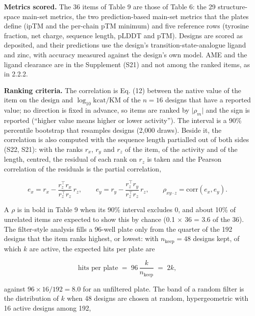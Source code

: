 \documentclass[
  10pt,
]{article}
\DeclareRobustCommand{\_}{\textunderscore\hspace{0pt}}
\begin{document}
\textbf{Metrics
scored.} The 36
items of Table 9 are
those of Table 6:
the 29
structure-space
main-set metrics,
the two
prediction-based
main-set metrics
that the plates
define (ipTM and the
per-chain pTM
minimum) and five
reference rows
(tyrosine fraction,
net charge, sequence
length, pLDDT and
pTM). Designs are
scored as deposited,
and their
predictions use the
design's
transition-state-analogue
ligand and zinc,
with accuracy
measured against the
design's own model.
AME and the ligand
clearance are in the
Supplement (S21) and
not among the ranked
items, as in 2.2.2.

\textbf{Ranking
criteria.} The
correlation is Eq.
(12) between the
native value of the
item on the design
and
\(\log_{10}\mathrm{kcat/KM}\)
of the \(n = 16\)
designs that have a
reported value; no
direction is fixed
in advance, so items
are ranked by
\(\lvert\rho_m\rvert\)
and the sign is
reported (``higher
value means higher
or lower
activity''). The
interval is a 90\%
percentile bootstrap
that resamples
designs (2,000
draws). Beside it,
the correlation is
also computed with
the sequence length
partialled out of
both sides (S22,
S21): with the ranks
\(r_x\), \(r_y\) and
\(r_z\) of the item,
of the activity and
of the length,
centred, the
residual of each
rank on \(r_z\) is
taken and the
Pearson correlation
of the residuals is
the partial
correlation,

\begin{equation*}e_x = r_x - \frac{r_z^{\top} r_x}{r_z^{\top} r_z}\, r_z, \qquad e_y = r_y - \frac{r_z^{\top} r_y}{r_z^{\top} r_z}\, r_z, \qquad \rho_{xy\cdot z} = \mathrm{corr}(e_x, e_y). \tag{15}\end{equation*}

A \(\rho\) is in
bold in Table 9 when
its 90\% interval
excludes 0, and
about 10\% of
unrelated items are
expected to show
this by chance (0.1
× 36 = 3.6 of the
36). The
filter-style
analysis fills a
96-well plate only
from the quarter of
the 192 designs that
the item ranks
highest, or lowest:
with
\(n_{\mathrm{keep}} = 48\)
designs kept, of
which \(k\) are
active, the expected
hits per plate are

\begin{equation*}\text{hits per plate} \;=\; 96\,\frac{k}{n_{\mathrm{keep}}} \;=\; 2k , \tag{16}\end{equation*}

against
\(96 \times 16/192 = 8.0\)
for an unfiltered
plate. The band of a
random filter is the
distribution of
\(k\) when 48
designs are chosen
at random,
hypergeometric with
16 active designs
among 192,
\end{document}
